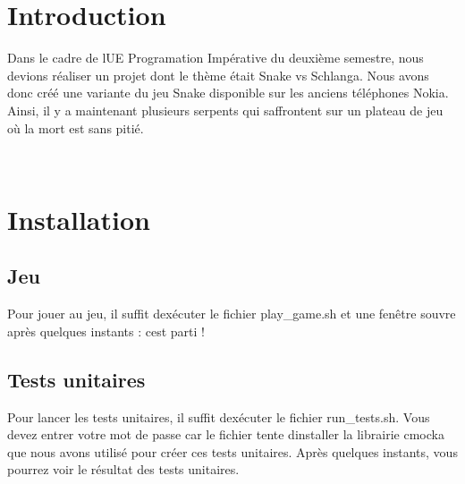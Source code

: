 \hypertarget{index_intro_sec}{}\section{Introduction}\label{index_intro_sec}
Dans le cadre de l\textquotesingle{}UE Programation Impérative du deuxième semestre, nous devions réaliser un projet dont le thème était Snake vs Schlanga. Nous avons donc créé une variante du jeu Snake disponible sur les anciens téléphones Nokia. Ainsi, il y a maintenant plusieurs serpents qui s\textquotesingle{}affrontent sur un plateau de jeu où la mort est sans pitié.

~\newline
 \hypertarget{index_install_sec}{}\section{Installation}\label{index_install_sec}
\hypertarget{index_step1}{}\subsection{Jeu}\label{index_step1}
Pour jouer au jeu, il suffit d\textquotesingle{}exécuter le fichier play\+\_\+game.\+sh et une fenêtre s\textquotesingle{}ouvre après quelques instants \+: c\textquotesingle{}est parti !\hypertarget{index_step2}{}\subsection{Tests unitaires}\label{index_step2}
Pour lancer les tests unitaires, il suffit d\textquotesingle{}exécuter le fichier run\+\_\+tests.\+sh. Vous devez entrer votre mot de passe car le fichier tente d\textquotesingle{}installer la librairie cmocka que nous avons utilisé pour créer ces tests unitaires. Après quelques instants, vous pourrez voir le résultat des tests unitaires.

